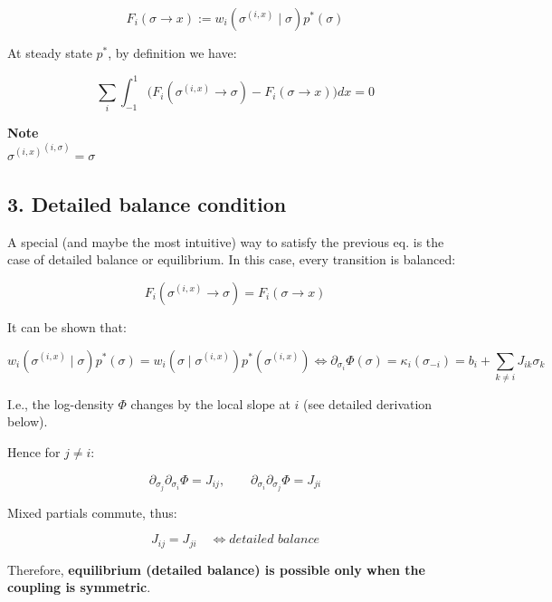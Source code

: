 \documentclass{article}
\begin{document}
\begin{equation}
F_i(\sigma \to x) := w_i(\sigma^{(i,x)}\mid\sigma) p^\ast(\sigma)
\end{equation}

At steady state $p^\ast$, by definition we have:

\begin{equation}
\sum_i \int_{-1}^1 \Big(F_i(\sigma^{(i,x)}\to\sigma)-F_i(\sigma\to x)\Big) dx = 0
\end{equation}

\begin{framed}
\textbf{Note}\\
${\sigma^{(i,x)}}^{(i,\sigma)} = \sigma$
\end{framed}

\subsection{3. Detailed balance condition}

A special (and maybe the most intuitive) way to satisfy the previous eq. is the case of detailed balance or equilibrium. In this case, every transition is balanced:

\begin{equation}
F_i(\sigma^{(i,x)}\to\sigma) = F_i(\sigma\to x)
\end{equation}

It can be shown that:

\begin{equation}
w_i(\sigma^{(i,x)}\mid\sigma) p^\ast(\sigma) = w_i(\sigma\mid\sigma^{(i,x)}) p^\ast(\sigma^{(i,x)}) \iff \partial_{\sigma_i}\Phi(\sigma) = \kappa_i(\sigma_{-i}) = b_i + \sum_{k\neq i} J_{ik} \sigma_k
\end{equation}

I.e., the log-density $\Phi$ changes by the local slope at $i$ (see detailed derivation below).

Hence for $j\neq i$:

\begin{equation}
\partial_{\sigma_j}\partial_{\sigma_i}\Phi = J_{ij}, \qquad \partial_{\sigma_i}\partial_{\sigma_j}\Phi = J_{ji}
\end{equation}

Mixed partials commute, thus:

\begin{equation}
J_{ij}=J_{ji} \quad \iff \textit{detailed balance}
\end{equation}

Therefore, \textbf{equilibrium (detailed balance) is possible only when the coupling is symmetric}.
\end{document}
